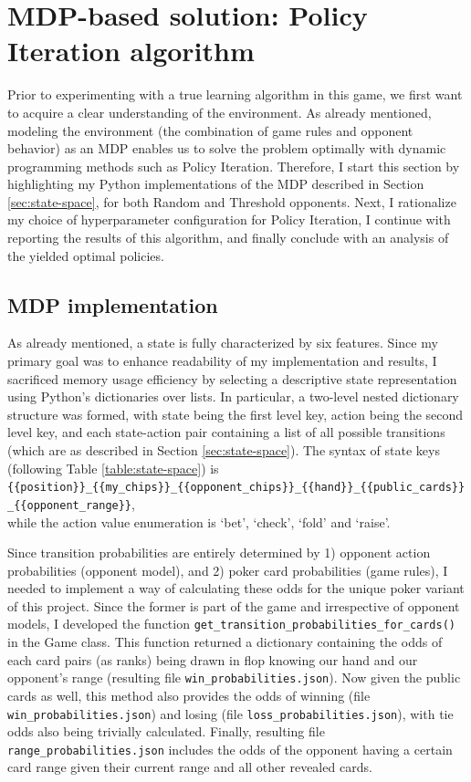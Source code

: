 \section{MDP-based solution: Policy Iteration algorithm}

Prior to experimenting with a true learning algorithm in this game, we first want to acquire a clear understanding of the environment. As already mentioned, modeling the environment (the combination of game rules and opponent behavior) as an MDP enables us to solve the problem optimally with dynamic programming methods such as Policy Iteration. Therefore, I start this section by highlighting my Python implementations of the MDP described in Section \ref{sec:state-space}, for both Random and Threshold opponents. Next, I rationalize my choice of hyperparameter configuration for Policy Iteration, I continue with reporting the results of this algorithm, and finally conclude with an analysis of the yielded optimal policies.

\subsection{MDP implementation}

As already mentioned, a state is fully characterized by six features. Since my primary goal was to enhance readability of my implementation and results, I sacrificed memory usage efficiency by selecting a descriptive state representation using Python's dictionaries over lists. In particular, a two-level nested dictionary structure was formed, with state being the first level key, action being the second level key, and each state-action pair containing a list of all possible transitions (which are as described in Section \ref{sec:state-space}). The syntax of state keys (following Table \ref{table:state-space}) is {\small \Verb|{{position}}_{{my_chips}}_{{opponent_chips}}_{{hand}}_{{public_cards}}_{{opponent_range}}|}, \\ while the action value enumeration is `bet', `check', `fold' and `raise'.

Since transition probabilities are entirely determined by 1) opponent action probabilities (opponent model), and 2) poker card probabilities (game rules), I needed to implement a way of calculating these odds for the unique poker variant of this project. Since the former is part of the game and irrespective of opponent models, I developed the function \Verb|get_transition_probabilities_for_cards()| in the Game class. This function returned a dictionary containing the odds of each card pairs (as ranks) being drawn in flop knowing our hand and our opponent's range (resulting file \Verb|win_probabilities.json|). Now given the public cards as well, this method also provides the odds of winning (file \\ \Verb|win_probabilities.json|) and losing (file \Verb|loss_probabilities.json|), with tie odds also being trivially calculated. Finally, resulting file \Verb|range_probabilities.json| includes the odds of the opponent having a certain card range given their current range and all other revealed cards.

